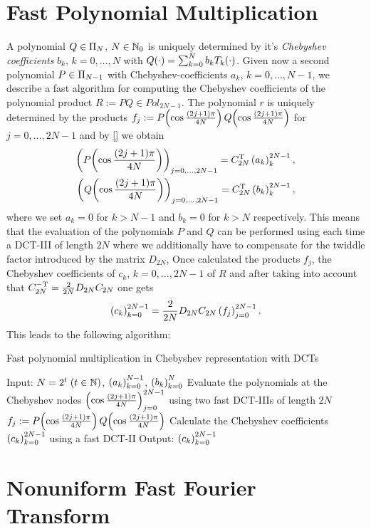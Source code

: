 \section{Fast Polynomial Multiplication}
\label{Basics:FastPolynomialMultiplication}
A polynomial $Q \in \Pi_{N}$, $N \in \mathbb{N}_{0}$ is uniquely determined by it's \emph{Chebyshev coefficients} 
$b_{k}$, $k = 0,\ldots,N$ with
$Q{\hspace{-0.4ex}}\left(\cdot\right) = \sum_{k=0}^N b_{k} T_{k}{\hspace{-0.4ex}}\left(\cdot\right)$. Given now a second polynomial $P \in \Pi_{N-1}$ with 
Chebyshev-coefficients $a_{k}$, $k = 0,\ldots,N-1$, we describe a fast algorithm for computing the 
Chebyshev coefficients of the polynomial product $R := P Q \in Pol_{2N-1}$. The polynomial $r$ is uniquely determined 
by the products $f_{j} := P{\hspace{-0.4ex}}\left(\cos \frac{(2j+1)\pi}{4N}\right) Q{\hspace{-0.4ex}}\left(\cos \frac{(2j+1)\pi}{4N}\right)$ for $j = 0,\ldots,2N-1$ and 
by \eqref{} we obtain
\begin{eqnarray*}
  \left(P{\hspace{-0.4ex}}\left(\cos \frac{(2j+1)\pi}{4N}\right)\right)_{j=0,\ldots,2N-1} = C_{2N}^{\text{\rm{T}}} \left(a_{k}\right)_{k}^{2N-1},\\
  \left(Q{\hspace{-0.4ex}}\left(\cos \frac{(2j+1)\pi}{4N}\right)\right)_{j=0,\ldots,2N-1} = C_{2N}^{\text{\rm{T}}} \left(b_{k}\right)_{k}^{2N-1},
\end{eqnarray*}
where we set $a_{k} = 0$ for $k > N-1$ and $b_{k} = 0$ for $k > N$ respectively. This means that the evaluation 
of the polynomials $P$ and $Q$ can be performed using each time a DCT-III of length $2N$ where we additionally have to 
compensate for the twiddle factor introduced by the matrix $D_{2N}$,
Once calculated the products $f_{j}$, the Chebyshev coefficients of $c_{k}$, $k = 0,\ldots,2N-1$ of $R$ and after
taking into account that $C_{2N}^{-\text{\rm{T}}} = \frac{2}{2N} D_{2N} C_{2N}$ one gets
$$ \left(c_{k}\right)_{k=0}^{2N-1} = \frac{2}{2N} D_{2N} C_{2N} \left(f_{j}\right)_{j = 0}^{2N-1}.$$
This leads to the following algorithm:

\begin{algorithm}[ht]
  \caption{Fast polynomial multiplication in Chebyshev representation with DCTs}
  \label{Afastpoly}    
  \begin{algorithmic}
    \STATE  Input:  $N = 2^t\; (t \in \mathbb{N})$, $\left(a_{k}\right)_{k = 0}^{N-1}$, $\left(b_{k}\right)_{k = 0}^{N}$
    \STATE
    \STATE Evaluate the polynomials at the Chebyshev nodes $\left(\cos \frac{(2j+1)\pi}{4N}\right)_{j = 0}^{2N-1}$
      using two fast DCT-IIIs of length $2N$
    \STATE 
      \STATE $f_{j} := P{\hspace{-0.4ex}}\left(\cos \frac{(2j+1)\pi}{4N}\right) Q{\hspace{-0.4ex}}\left(\cos \frac{(2j+1)\pi}{4N}\right)$
    \ENDFOR
    \STATE
    \STATE Calculate the Chebyshev coefficients $\left(c_{k}\right)_{k=0}^{2N-1}$ using a fast DCT-II 
    \STATE
    \STATE Output: $\left(c_{k}\right)_{k=0}^{2N-1}$
\end{algorithmic}
\end{algorithm}

\section{Nonuniform Fast Fourier Transform}
\label{Basics:NFFT}
